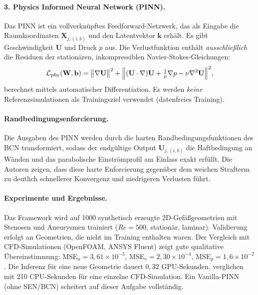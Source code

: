 \documentclass[a4paper,12pt]{article}
\begin{document}
\paragraph{3. Physics Informed Neural Network (PINN).}
Das PINN ist ein vollverkn\"upftes Feedforward-Netzwerk, das als Eingabe die
Raumkoordinaten $\mathbf{X}_{j,(i,b)}$ und den Latentvektor $\mathbf{k}$
erh\"alt. Es gibt Geschwindigkeit $\mathbf{U}$ und Druck $p$ aus. Die
Verlustfunktion enth\"alt \emph{ausschlie\ss{}lich} die Residuen der
station\"aren, inkompressiblen Navier-Stokes-Gleichungen:
\begin{equation}
  \mathcal{L}_\text{phy}(\mathbf{W}, \mathbf{b}) =
  \bigl\|\nabla \mathbf{U}\bigr\|^2 +
  \Bigl\|(\mathbf{U} \cdot \nabla)\mathbf{U}
  + \tfrac{1}{\rho}\nabla p - \nu\nabla^2 \mathbf{U}\Bigr\|^2,
\end{equation}
berechnet mittels automatischer Differentiation. Es werden \emph{keine}
Referenzsimulationen als Trainingsziel verwendet (datenfreies Training).

\paragraph{Randbedingungsenforcierung.}
Die Ausgaben des PINN werden durch die harten Randbedingungsfunktionen des BCN
transformiert, sodass der endg\"ultige Output $\mathbf{U}_{j,(i,b)}$ die
Haftbedingung an W\"anden und das parabolische Einstr\"omprofil am Einlass
exakt erf\"ullt. Die Autoren zeigen, dass diese harte Enforcierung gegen\"uber
dem weichen Strafterm zu deutlich schnellerer Konvergenz und niedrigeren
Verlusten f\"uhrt.

\paragraph{Experimente und Ergebnisse.}
Das Framework wird auf 1000 synthetisch erzeugte 2D-Gef\"a\ss{}geometrien mit
Stenosen und Aneurysmen trainiert ($Re = 500$, station\"ar, laminar).
Validierung erfolgt an Geometrien, die nicht im Training enthalten waren.
Der Vergleich mit CFD-Simulationen (OpenFOAM, ANSYS Fluent) zeigt gute
qualitative \"Ubereinstimmung: MSE$_u = 3{,}61 \times 10^{-3}$,
MSE$_v = 2{,}30 \times 10^{-4}$, MSE$_p = 1{,}6 \times 10^{-2}$.
Die Inferenz f\"ur eine neue Geometrie dauert $0{,}32$ GPU-Sekunden,
verglichen mit 210 CPU-Sekunden f\"ur eine einzelne CFD-Simulation.
Ein Vanilla-PINN (ohne SEN/BCN) scheitert auf dieser Aufgabe vollst\"andig.

\end{document}
